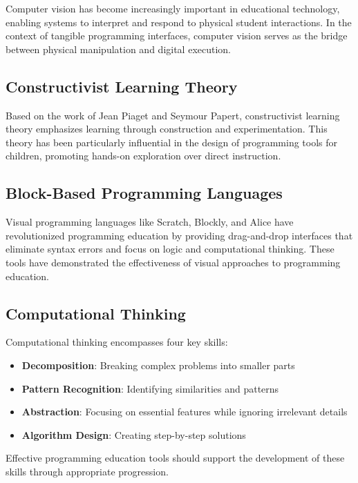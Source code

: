 Computer vision has become increasingly important in educational technology, enabling systems to interpret and respond to physical student interactions. In the context of tangible programming interfaces, computer vision serves as the bridge between physical manipulation and digital execution.


\subsection{Constructivist Learning Theory}

Based on the work of Jean Piaget and Seymour Papert, constructivist learning theory emphasizes learning through construction and experimentation. This theory has been particularly influential in the design of programming tools for children, promoting hands-on exploration over direct instruction.

\subsection{Block-Based Programming Languages}

Visual programming languages like Scratch, Blockly, and Alice have revolutionized programming education by providing drag-and-drop interfaces that eliminate syntax errors and focus on logic and computational thinking. These tools have demonstrated the effectiveness of visual approaches to programming education.

\subsection{Computational Thinking}

Computational thinking encompasses four key skills:
\begin{itemize}
    \item \textbf{Decomposition}: Breaking complex problems into smaller parts
    \item \textbf{Pattern Recognition}: Identifying similarities and patterns
    \item \textbf{Abstraction}: Focusing on essential features while ignoring irrelevant details
    \item \textbf{Algorithm Design}: Creating step-by-step solutions
\end{itemize}

Effective programming education tools should support the development of these skills through appropriate progression.


